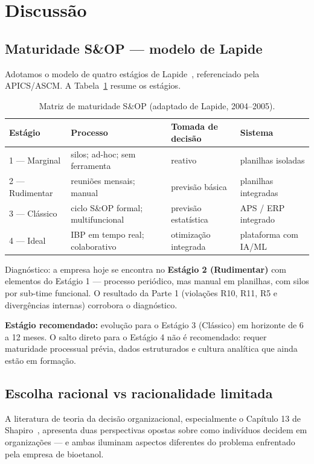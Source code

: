 \documentclass[11pt,a4paper]{article}
\begin{document}
\section{Discussão}
\label{sec:discussao}

\subsection{Maturidade S\&OP — modelo de Lapide}
Adotamos o modelo de quatro estágios de Lapide~\cite{lapide2004partI,lapide2004partII,lapide2005partIII}, referenciado pela APICS/ASCM. A Tabela~\ref{tab:lapide} resume os estágios.

\begin{table}[h]
\centering
\caption{Matriz de maturidade S\&OP (adaptado de Lapide, 2004–2005).}
\label{tab:lapide}
\begin{tabular}{lp{4.0cm}p{3.4cm}p{3.5cm}}
\toprule
\textbf{Estágio} & \textbf{Processo} & \textbf{Tomada de decisão} & \textbf{Sistema} \\
\midrule
1 — Marginal   & silos; ad-hoc; sem ferramenta & reativo & planilhas isoladas \\
2 — Rudimentar & reuniões mensais; manual & previsão básica & planilhas integradas \\
3 — Clássico   & ciclo S\&OP formal; multifuncional & previsão estatística & APS / ERP integrado \\
4 — Ideal      & IBP em tempo real; colaborativo & otimização integrada & plataforma com IA/ML \\
\bottomrule
\end{tabular}
\end{table}

Diagnóstico: a empresa hoje se encontra no \textbf{Estágio 2 (Rudimentar)} com elementos do Estágio 1 — processo periódico, mas manual em planilhas, com silos por sub-time funcional. O resultado da Parte 1 (violações R10, R11, R5 e divergências internas) corrobora o diagnóstico.

\textbf{Estágio recomendado:} evolução para o Estágio 3 (Clássico) em horizonte de 6 a 12 meses. O salto direto para o Estágio 4 não é recomendado: requer maturidade processual prévia, dados estruturados e cultura analítica que ainda estão em formação.

\subsection{Escolha racional vs racionalidade limitada}
A literatura de teoria da decisão organizacional, especialmente o Capítulo 13 de Shapiro~\cite{shapiro2006modeling}, apresenta duas perspectivas opostas sobre como indivíduos decidem em organizações --- e ambas iluminam aspectos diferentes do problema enfrentado pela empresa de bioetanol.
\end{document}
